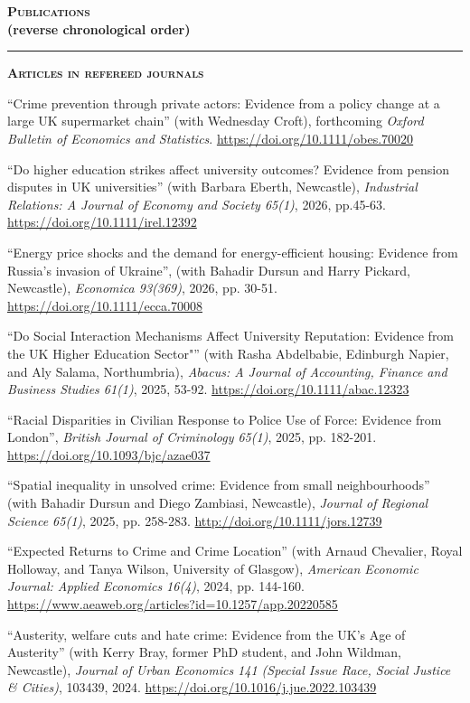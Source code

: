 \documentclass[10pt,pdftex,a4paper,oneside]{article}
\begin{document}
\textbf{\textsc{Publications} \\ (reverse chronological order)}
\vspace{.5ex}
\hrule
\textbf{\textsc{Articles in refereed journals}}
\begin{etaremune}
\setlength{\itemsep}{0pt}
  \setlength{\parskip}{0pt}
  \setlength{\parsep}{0pt}
  \item ``Crime prevention through private actors: Evidence from a policy change at a large UK supermarket chain'' (with Wednesday Croft), forthcoming \emph{Oxford Bulletin of Economics and Statistics}. \url{https://doi.org/10.1111/obes.70020}
  \item ``Do higher education strikes affect university outcomes? Evidence from pension disputes in UK universities'' (with Barbara Eberth, Newcastle), \emph{Industrial Relations: A Journal of Economy and Society 65(1)}, 2026, pp.45-63. \url{https://doi.org/10.1111/irel.12392}
  \item ``Energy price shocks and the demand for energy-efficient housing: Evidence from Russia's invasion of Ukraine'', (with Bahadir Dursun and Harry Pickard, Newcastle), \emph{Economica 93(369)}, 2026, pp. 30-51. \url{https://doi.org/10.1111/ecca.70008}
  \item ``Do Social Interaction Mechanisms Affect University Reputation: Evidence from the UK Higher Education Sector"'' (with Rasha Abdelbabie, Edinburgh Napier, and Aly Salama, Northumbria),  \emph{Abacus: A Journal of Accounting, Finance and Business Studies 61(1)}, 2025, 53-92. \url{https://doi.org/10.1111/abac.12323}
    \item  ``Racial Disparities in Civilian Response to Police Use of Force: Evidence from London'',  \emph{British Journal of Criminology 65(1)}, 2025, pp. 182-201. \url{https://doi.org/10.1093/bjc/azae037}
    \item ``Spatial inequality in unsolved crime: Evidence from small neighbourhoods'' (with Bahadir Dursun and Diego Zambiasi, Newcastle), \emph{Journal of Regional Science 65(1)}, 2025, pp. 258-283. \url{http://doi.org/10.1111/jors.12739}
\item ``Expected Returns to Crime and Crime Location'' (with Arnaud Chevalier, Royal Holloway, and Tanya Wilson, University of Glasgow),  \emph{American Economic Journal: Applied Economics 16(4)}, 2024, pp. 144-160. \url{https://www.aeaweb.org/articles?id=10.1257/app.20220585}
\item ``Austerity, welfare cuts and hate crime: Evidence from the UK's Age of Austerity'' (with  Kerry Bray, former PhD student, and John Wildman, Newcastle),  \emph{Journal of Urban Economics 141 (Special Issue Race, Social Justice \& Cities)}, 103439, 2024.  \url{https://doi.org/10.1016/j.jue.2022.103439}

\end{etaremune}
\end{document}
